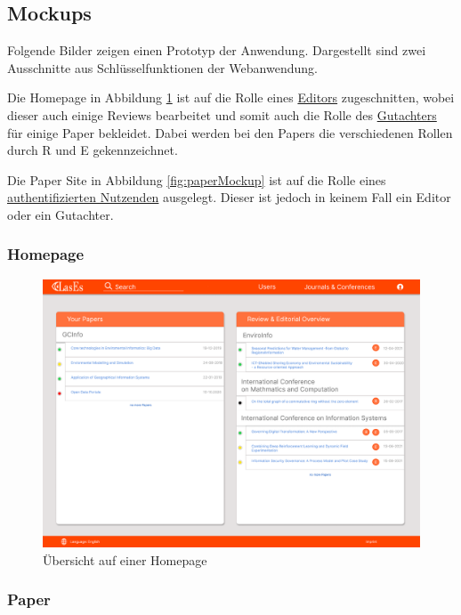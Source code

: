 \subsection{Mockups}

Folgende Bilder zeigen einen Prototyp der Anwendung.
Dargestellt sind zwei Ausschnitte aus Schlüsselfunktionen der Webanwendung.

Die Homepage in Abbildung \ref{fig:homepageMockup} ist auf die Rolle eines \hyperref[glo:editor]{Editors} zugeschnitten, wobei dieser auch einige
Reviews bearbeitet und somit auch die Rolle des \hyperref[glo:gutachter]{Gutachters} für einige Paper bekleidet.
Dabei werden bei den Papers die verschiedenen Rollen durch R und E gekennzeichnet.

Die Paper Site in Abbildung \ref{fig:paperMockup} ist auf die Rolle eines \hyperref[glo:regnutzer]{authentifizierten Nutzenden} ausgelegt.
Dieser ist jedoch in keinem Fall ein Editor oder ein Gutachter.


\subsubsection{Homepage}

\begin{figure}[H]
	\centering
	\includegraphics[width=0.85\linewidth]{graphics/Homepage_png}
	\caption{Übersicht auf einer Homepage}
	\label{fig:homepageMockup}
\end{figure}

\subsubsection{Paper}

